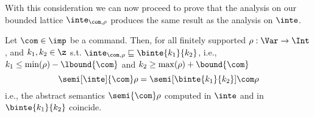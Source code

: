 With this consideration we can now proceed to prove that the analysis
on our bounded lattice \(\inte_{\com,\rho}\) produces the same result
as the analysis on \(\inte\).


\begin{theorem}
  Let \(\com\in \imp\) be a command. Then, for all finitely supported
  \(\rho : \Var \to \Int\), and \(k_1, k_2\in \z\) s.t.
  \(\inte_{\com,\rho} \sqsubseteq \binte{k_1}{k_2}\), i.e.,
  \(k_1 \leq \min(\rho) - \lbound{\com}\) and
  \(k_2 \geq \max(\rho) + \bound{\com}\)
  \begin{equation*}
    \semi[\inte]{\com}\rho = \semi[\binte{k_1}{k_2}]{\com}\rho
  \end{equation*}
  i.e., the abstract semantics \(\semi{\com} \rho\)
  computed in \(\inte\) and in \(\binte{k_1}{k_2}\) coincide.
\end{theorem}

